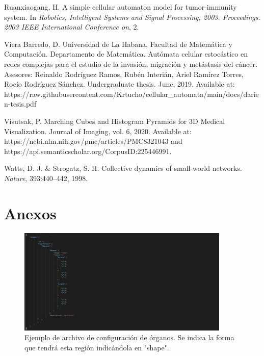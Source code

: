 \documentclass[a4paper,11pt]{article}
\begin{document}
{\begin{flushleft}
\begin{thebibliography}{99}
\vskip 0.2cm
 Ruanxiaogang, H. A simple cellular automaton model for tumor-immunity system. In \textit{Robotics, Intelligent Systems and Signal Processing, 2003. Proceedings. 2003 IEEE International Conference on}, 2.

\vskip 0.2cm
 Viera Barredo, D. Universidad de La Habana, Facultad de Matemática y Computación. Departamento de Matemática. Autómata celular estocástico en redes complejas para el estudio de la invasión, migración y metástasis del cáncer. Asesores: Reinaldo Rodríguez Ramos, Rubén Interián, Ariel Ramírez Torres, Rocío Rodríguez Sánchez. Undergraduate thesis. June, 2019. Available at: https://raw.githubusercontent.com/Krtucho/cellular\_automata/main/docs/darien-tesis.pdf

\vskip 0.2cm
 Visutsak, P. Marching Cubes and Histogram Pyramids for 3D Medical Visualization. Journal of Imaging, vol. 6, 2020. Available at: https://ncbi.nlm.nih.gov/pmc/articles/PMC8321043 and https://api.semanticscholar.org/CorpusID:225446991.

\vskip 0.2cm
 Watts, D. J. \& Strogatz, S. H. Collective dynamics of small-world networks. \textit{Nature}, 393:440–442, 1998.

\end{thebibliography}


\end{flushleft}

\newpage
\section*{Anexos}

\begin{figure}[h]
  \centering
  \includegraphics[width=0.9\textwidth]{organ_config.jpg}
  \caption{Ejemplo de archivo de configuraci\'on de \'organos. Se indica la forma que tendr\'a esta regi\'on indic\'andola en "shape".}
  \label{fig:organ_config}
\end{figure}

}
\end{document}
